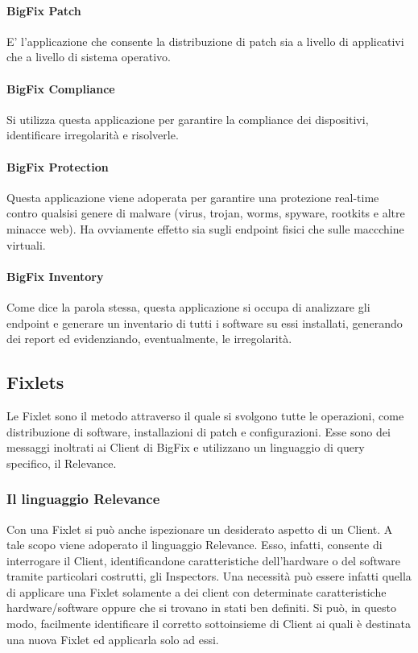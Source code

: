 \paragraph{BigFix Patch}
E' l'applicazione che consente la distribuzione di patch sia a livello di applicativi che a livello di sistema operativo.
\paragraph{BigFix Compliance}
Si utilizza questa applicazione per garantire la compliance dei dispositivi, identificare irregolarità e risolverle.
\paragraph{BigFix Protection}
Questa applicazione viene adoperata per garantire una protezione real-time contro qualsisi genere di malware (virus, trojan, worms, spyware, rootkits e altre minacce web). Ha ovviamente effetto sia sugli endpoint fisici che sulle maccchine virtuali.
\paragraph{BigFix Inventory}
Come dice la parola stessa, questa applicazione si occupa di analizzare gli endpoint e generare un inventario di tutti i software su essi installati, generando dei report ed evidenziando, eventualmente, le irregolarità.

\subsection{Fixlets}
Le Fixlet sono il metodo attraverso il quale si svolgono tutte le operazioni, come distribuzione di software, installazioni di patch e configurazioni. Esse sono dei messaggi inoltrati ai Client di BigFix e utilizzano un linguaggio di query specifico, il Relevance.
\subsubsection{Il linguaggio Relevance}
Con una Fixlet si può anche ispezionare un desiderato aspetto di un Client. A tale scopo viene adoperato il linguaggio Relevance. Esso, infatti, consente di interrogare il Client, identificandone caratteristiche dell'hardware o del software tramite particolari costrutti, gli Inspectors. Una necessità può essere infatti quella di applicare una Fixlet solamente a dei client con determinate caratteristiche hardware/software oppure che si trovano in stati ben definiti. Si può, in questo modo, facilmente identificare il corretto sottoinsieme di Client ai quali è destinata una nuova Fixlet ed applicarla solo ad essi.

